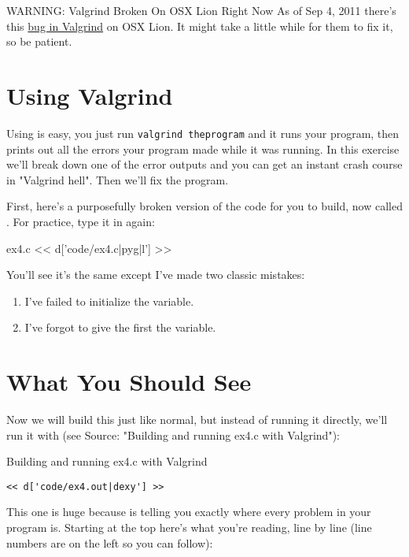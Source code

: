 \begin{aside}{WARNING: Valgrind Broken On OSX Lion Right Now}
As of Sep 4, 2011 there's this \href{http://bit.ly/qRxc6s}{bug in Valgrind}
on OSX Lion.  It might take a little while for them to fix it, so be patient.
\end{aside}

\section{Using Valgrind}

Using  is easy, you just run \verb|valgrind theprogram| and it
runs your program, then prints out all the errors your program made while it
was running.  In this exercise we'll break down one of the error outputs
and you can get an instant crash course in "Valgrind hell".  Then we'll
fix the program.

First, here's a purposefully broken version of the  code
for you to build, now called .  For practice, type it
in again:

\begin{code}{ex4.c}
<< d['code/ex4.c|pyg|l'] >>
\end{code}

You'll see it's the same except I've made two classic mistakes:

\begin{enumerate}
\item I've failed to initialize the  variable.
\item I've forgot to give the first  the  variable.
\end{enumerate}

\section{What You Should See}

Now we will build this just like normal, but instead of running it
directly, we'll run it with  (see Source: "Building and running ex4.c with Valgrind"):

\begin{Terminal}{Building and running ex4.c with Valgrind}
\begin{lstlisting}
<< d['code/ex4.out|dexy'] >>
\end{lstlisting}
\end{Terminal}

This one is huge because  is telling you exactly where
every problem in your program is.  Starting at the top here's what you're
reading, line by line (line numbers are on the left so you can follow):


